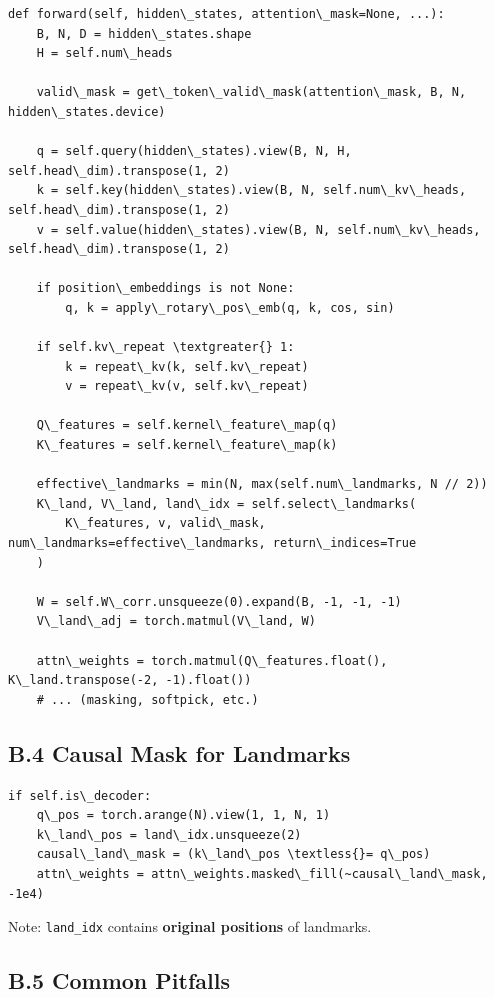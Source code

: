 \begin{lstlisting}
def forward(self, hidden\_states, attention\_mask=None, ...):
    B, N, D = hidden\_states.shape
    H = self.num\_heads
    
    valid\_mask = get\_token\_valid\_mask(attention\_mask, B, N, hidden\_states.device)
    
    q = self.query(hidden\_states).view(B, N, H, self.head\_dim).transpose(1, 2)
    k = self.key(hidden\_states).view(B, N, self.num\_kv\_heads, self.head\_dim).transpose(1, 2)
    v = self.value(hidden\_states).view(B, N, self.num\_kv\_heads, self.head\_dim).transpose(1, 2)
    
    if position\_embeddings is not None:
        q, k = apply\_rotary\_pos\_emb(q, k, cos, sin)
    
    if self.kv\_repeat \textgreater{} 1:
        k = repeat\_kv(k, self.kv\_repeat)
        v = repeat\_kv(v, self.kv\_repeat)
    
    Q\_features = self.kernel\_feature\_map(q)
    K\_features = self.kernel\_feature\_map(k)
    
    effective\_landmarks = min(N, max(self.num\_landmarks, N // 2))
    K\_land, V\_land, land\_idx = self.select\_landmarks(
        K\_features, v, valid\_mask, num\_landmarks=effective\_landmarks, return\_indices=True
    )
    
    W = self.W\_corr.unsqueeze(0).expand(B, -1, -1, -1)
    V\_land\_adj = torch.matmul(V\_land, W)
    
    attn\_weights = torch.matmul(Q\_features.float(), K\_land.transpose(-2, -1).float())
    # ... (masking, softpick, etc.)
\end{lstlisting}

\subsection{B.4 Causal Mask for Landmarks}

\begin{lstlisting}
if self.is\_decoder:
    q\_pos = torch.arange(N).view(1, 1, N, 1)
    k\_land\_pos = land\_idx.unsqueeze(2)
    causal\_land\_mask = (k\_land\_pos \textless{}= q\_pos)
    attn\_weights = attn\_weights.masked\_fill(~causal\_land\_mask, -1e4)
\end{lstlisting}

Note: \texttt{land\_idx} contains \textbf{original positions} of landmarks.

\subsection{B.5 Common Pitfalls}

